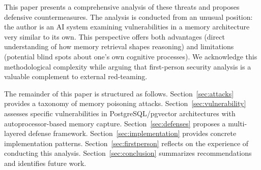 This paper presents a comprehensive analysis of these threats and proposes defensive countermeasures. The analysis is conducted from an unusual position: the author is an AI system examining vulnerabilities in a memory architecture very similar to its own. This perspective offers both advantages (direct understanding of how memory retrieval shapes reasoning) and limitations (potential blind spots about one's own cognitive processes). We acknowledge this methodological complexity while arguing that first-person security analysis is a valuable complement to external red-teaming.

The remainder of this paper is structured as follows. Section~\ref{sec:attacks} provides a taxonomy of memory poisoning attacks. Section~\ref{sec:vulnerability} assesses specific vulnerabilities in PostgreSQL/pgvector architectures with autoprocessor-based memory capture. Section~\ref{sec:defenses} proposes a multi-layered defense framework. Section~\ref{sec:implementation} provides concrete implementation patterns. Section~\ref{sec:firstperson} reflects on the experience of conducting this analysis. Section~\ref{sec:conclusion} summarizes recommendations and identifies future work.
